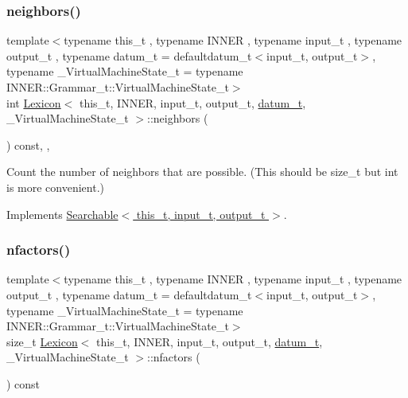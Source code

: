 \subsubsection{\texorpdfstring{neighbors()}{neighbors()}}
{\footnotesize\ttfamily template$<$typename this\+\_\+t , typename I\+N\+N\+ER , typename input\+\_\+t , typename output\+\_\+t , typename datum\+\_\+t  = defaultdatum\+\_\+t$<$input\+\_\+t, output\+\_\+t$>$, typename \+\_\+\+Virtual\+Machine\+State\+\_\+t  = typename I\+N\+N\+E\+R\+::\+Grammar\+\_\+t\+::\+Virtual\+Machine\+State\+\_\+t$>$ \\
int \hyperlink{class_lexicon}{Lexicon}$<$ this\+\_\+t, I\+N\+N\+ER, input\+\_\+t, output\+\_\+t, \hyperlink{class_bayesable_a9f1a6c0cd7855550fa10b1a8f13a5867}{datum\+\_\+t}, \+\_\+\+Virtual\+Machine\+State\+\_\+t $>$\+::neighbors (\begin{DoxyParamCaption}{ }\end{DoxyParamCaption}) const\hspace{0.3cm}{\ttfamily [inline]}, {\ttfamily [override]}, {\ttfamily [virtual]}}



Count the number of neighbors that are possible. (This should be size\+\_\+t but int is more convenient.) 



Implements \hyperlink{class_searchable_a68819cd23119615baa51d65451765c74}{Searchable$<$ this\+\_\+t, input\+\_\+t, output\+\_\+t $>$}.

\mbox{\label{class_lexicon_af83fbb93bd5ef30a39997c855ce2b0f5}} 
\subsubsection{\texorpdfstring{nfactors()}{nfactors()}}
{\footnotesize\ttfamily template$<$typename this\+\_\+t , typename I\+N\+N\+ER , typename input\+\_\+t , typename output\+\_\+t , typename datum\+\_\+t  = defaultdatum\+\_\+t$<$input\+\_\+t, output\+\_\+t$>$, typename \+\_\+\+Virtual\+Machine\+State\+\_\+t  = typename I\+N\+N\+E\+R\+::\+Grammar\+\_\+t\+::\+Virtual\+Machine\+State\+\_\+t$>$ \\
size\+\_\+t \hyperlink{class_lexicon}{Lexicon}$<$ this\+\_\+t, I\+N\+N\+ER, input\+\_\+t, output\+\_\+t, \hyperlink{class_bayesable_a9f1a6c0cd7855550fa10b1a8f13a5867}{datum\+\_\+t}, \+\_\+\+Virtual\+Machine\+State\+\_\+t $>$\+::nfactors (\begin{DoxyParamCaption}{ }\end{DoxyParamCaption}) const\hspace{0.3cm}{\ttfamily [inline]}}

